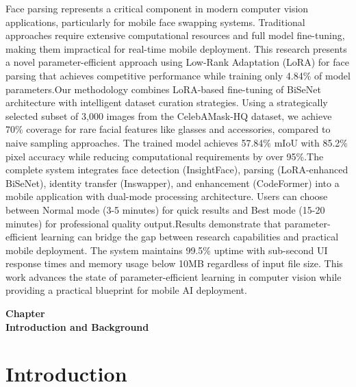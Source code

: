 \documentclass[12pt,a4paper]{report}
\begin{document}
Face parsing represents a critical component in modern computer vision applications, particularly for mobile face swapping systems. Traditional approaches require extensive computational resources and full model fine-tuning, making them impractical for real-time mobile deployment. This research presents a novel parameter-efficient approach using Low-Rank Adaptation (LoRA) for face parsing that achieves competitive performance while training only 4.84\% of model parameters.Our methodology combines LoRA-based fine-tuning of BiSeNet architecture with intelligent dataset curation strategies. Using a strategically selected subset of 3,000 images from the CelebAMask-HQ dataset, we achieve 70\% coverage for rare facial features like glasses and accessories, compared to naive sampling approaches. The trained model achieves 57.84\% mIoU with 85.2\% pixel accuracy while reducing computational requirements by over 95\%.The complete system integrates face detection (InsightFace), parsing (LoRA-enhanced BiSeNet), identity transfer (Inswapper), and enhancement (CodeFormer) into a mobile application with dual-mode processing architecture. Users can choose between Normal mode (3-5 minutes) for quick results and Best mode (15-20 minutes) for professional quality output.Results demonstrate that parameter-efficient learning can bridge the gap between research capabilities and practical mobile deployment. The system maintains 99.5\% uptime with sub-second UI response times and memory usage below 10MB regardless of input file size. This work advances the state of parameter-efficient learning in computer vision while providing a practical blueprint for mobile AI deployment.

\newpage
\tableofcontents
\newpage
\listoffigures
\newpage
\listoftables

\newpage
\clearpage
\thispagestyle{empty}  %
\vspace*{\fill}
\begin{center}
{\Huge\bfseries Chapter \thechapter}\\[30pt]
{\Huge\bfseries Introduction and Background}
\end{center}
\vspace*{\fill}
\label{ch:introduction}
\clearpage
\newpage
\section{Introduction}
\end{document}
